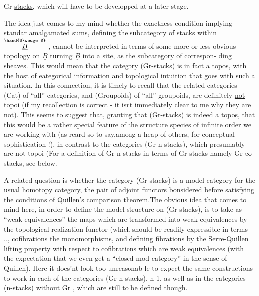 Gr-\uline{stacks}, which will have to  be developped at a later stage.

The idea just comes to my mind whether the exactness condition
implying standar amalgamated sums, defining the subcategory of stacks
within $\overset{\hand{$\wedge$}}{\underline{B}}$ , cannot be interpreted in terms of some more or less obvious
topology on $\underline{B}$ turning $\underline{B}$ into a site, as the subcategory of correspon-%
ding \uline{sheaves}. This would mean that the category (Gr-stacks) is in fact
a topos, with the host of eategorical information and topological
intuition that goes with such a situation. In this connection, it is
timely to recall that the related categories (Cat) of ``all'' categories,
and (Groupoids) of ``all'' groupoids, are definitely \uline{not} topoi (if my
recollection is correct - it isnt immediately clear to me why they
are not). This seems to suggest that, granting that (Gr-stacks) is
indeed a topos, that this would be a rather special feature of the
structure species of infinite order we are working with (as  reard so
to say,among a heap of others, for conceptual sophistication !), in
contrast to the categories (Gr-n-stacks), which presumably are not topoi
(For a definition of Gr-n-stacks in terms of Gr-stacks namely
Gr-$\infty$-stacks, see below.\hand{)}

A related question is whether the category (Gr-stacks) is a model
category for the usual homotopy category, the pair of adjoint functors
bonsidered before satisfying  the conditions of Quillen's comparison
theorem.The obvious idea that comes to mind here, in order to define
the model structure on (Gr-stacks), is to take as ``weak equivalences''
the maps which are transformed into weak equivalences by the topological
realization functor (which should be readily expressible in  terms  ..\hand{)},
 cofibrations the monomorphisms, and defining fibrations by the
Serre-Quillen lifting property with respect to cofibrations which are
weak equivalences (with the expectation that we even get a ``closed mod
category'' in the sense of Quillen). Here it does'nt look too unreasonab
\hand{-}le to expect the same constructions to work in each of the categories
(Gr-n-stacks), n \over{$>$}{$\geqslant$}1, as well as in the categories (n-stacks) without
Gr , which are still to be defined though.

